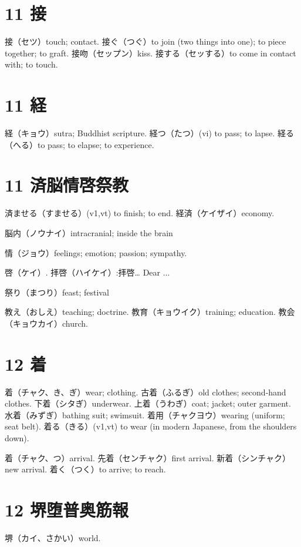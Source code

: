 \section{11 接}

接（セツ）touch; contact.
接ぐ（つぐ）to join (two things into one); to piece together; to graft.
接吻（セップン）kiss.
接する（セッする）to come in contact with; to touch.

\section{11 経}

経（キョウ）sutra; Buddhist scripture.
経つ（たつ）(vi) to pass; to lapse.
経る（へる）to pass; to elapse; to experience.

\section{11 済脳情啓祭教}

済ませる（すませる）(v1,vt) to finish; to end.
経済（ケイザイ）economy.

脳内（ノウナイ）intracranial; inside the brain

情（ジョウ）feelings; emotion; passion; sympathy.

啓（ケイ）.
拝啓（ハイケイ）:拝啓… Dear ...

祭り（まつり）feast; festival

教え（おしえ）teaching; doctrine.
教育（キョウイク）training; education.
教会（キョウカイ）church.

\section{12 着}

着（チャク、き、ぎ）wear; clothing.
古着（ふるぎ）old clothes; second-hand clothes.
下着（シタぎ）underwear.
上着（うわぎ）coat; jacket; outer garment.
水着（みずぎ）bathing suit; swimsuit.
着用（チャクヨウ）wearing (uniform; seat belt).
着る（きる）(v1,vt) to wear (in modern Japanese, from the shoulders down).

着（チャク、つ）arrival.
先着（センチャク）first arrival.
新着（シンチャク）new arrival.
着く（つく）to arrive; to reach.

\section{12 堺堕普奥筋報}

堺（カイ、さかい）world.

